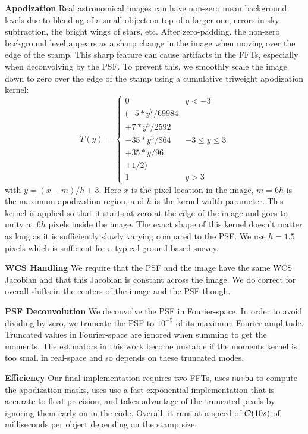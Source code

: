 \documentclass[twocolappendix, appendixfloats, numberedappendix, twocolumn, apj]{openjournal}
\begin{document}
\textbf{Apodization} Real astronomical images can have non-zero mean background levels
due to blending of a small object on top of a larger one, errors in sky subtraction,
the bright wings of stars, etc. After zero-padding, the non-zero background level appears
as a sharp change in the image when moving over the edge of the stamp. This sharp feature
can cause artifacts in the FFTs, especially when deconvolving by the PSF. To prevent this,
we smoothly scale the image down to zero over the edge of the stamp using a cumulative triweight
apodization kernel:
\begin{equation}
T(y) = \left\{
\begin{array}{cc}
0 & y < -3 \\
(-5 * y^7 / 69984 & \\
+ 7 * y^5 / 2592 & \\
- 35 * y^3 / 864 & -3 \le y \le 3 \\
+ 35 * y / 96 & \\
+ 1 / 2) &  \\
1 & y > 3
\end{array}
\right.
\end{equation}
with $y = (x-m)/h + 3$. Here $x$ is the pixel location in the image, $m=6h$ is the maximum
apodization region, and $h$ is the kernel width parameter. This kernel is applied so that it starts
at zero at the edge of the image and goes to unity at $6h$ pixels inside the image. The exact shape
of this kernel doesn't matter as long as it is sufficiently slowly varying compared to the PSF.
We use $h=1.5$ pixels which is sufficient for a typical ground-based survey.

\textbf{WCS Handling} We require that the PSF and the image have the same WCS Jacobian
and that this Jacobian is constant across the image. We do correct for overall shifts in the
centers of the image and the PSF though.

\textbf{PSF Deconvolution} We deconvolve the PSF in Fourier-space. In order to avoid dividing by
zero, we truncate the PSF to $10^{-5}$ of its maximum Fourier amplitude. Truncated values in Fourier-space
are ignored when summing to get the moments. The estimators in this work become unstable if the moments
kernel is too small in real-space and so depends on these truncated modes.

\textbf{Efficiency} Our final implementation requires two FFTs, uses \texttt{numba} to compute the
apodization masks, uses use a fast exponential implementation that is accurate to float precision,
and takes advantage of the truncated pixels by ignoring them early on in the code.
Overall, it runs at a speed of ${\cal O}(10s)$ of milliseconds per object depending on the stamp size.
\end{document}
